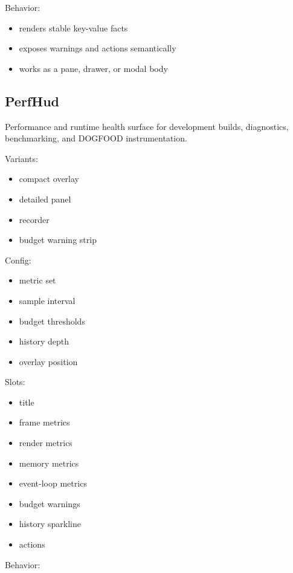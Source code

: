 Behavior:

\begin{itemize}
\tightlist
\item
  renders stable key-value facts
\item
  exposes warnings and actions semantically
\item
  works as a pane, drawer, or modal body
\end{itemize}

\subsection{PerfHud}\label{record-128-perfhud}

Performance and runtime health surface for development builds, diagnostics, benchmarking, and DOGFOOD instrumentation.

Variants:

\begin{itemize}
\tightlist
\item
  compact overlay
\item
  detailed panel
\item
  recorder
\item
  budget warning strip
\end{itemize}

Config:

\begin{itemize}
\tightlist
\item
  metric set
\item
  sample interval
\item
  budget thresholds
\item
  history depth
\item
  overlay position
\end{itemize}

Slots:

\begin{itemize}
\tightlist
\item
  title
\item
  frame metrics
\item
  render metrics
\item
  memory metrics
\item
  event-loop metrics
\item
  budget warnings
\item
  history sparkline
\item
  actions
\end{itemize}

Behavior:

